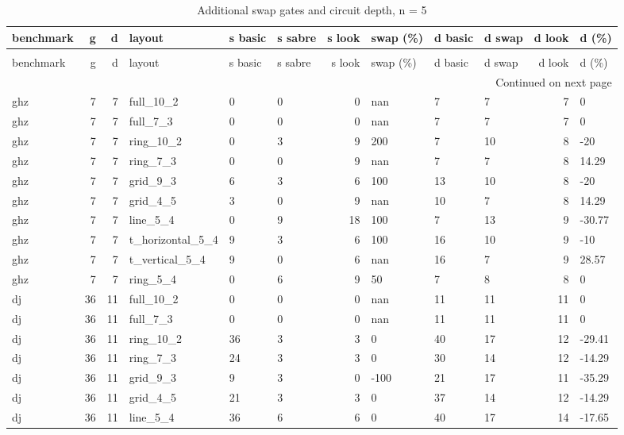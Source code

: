 \begin{longtable}{lrrlllrlllrl}
\caption{Additional swap gates and circuit depth, n = 5} \label{benchmark-table-5} \\
\toprule
benchmark & g & d & layout & s basic & s sabre & s look & swap (\%) & d basic & d swap & d look & d (\%) \\
\midrule
\endfirsthead
\caption[]{Additional swap gates and circuit depth, n = 5} \\
\toprule
benchmark & g & d & layout & s basic & s sabre & s look & swap (\%) & d basic & d swap & d look & d (\%) \\
\midrule
\endhead
\midrule
\multicolumn{12}{r}{Continued on next page} \\
\midrule
\endfoot
\bottomrule
\endlastfoot
ghz & 7 & 7 & full\_10\_2 & 0 & 0 & 0 & nan & 7 & 7 & 7 & 0 \\
ghz & 7 & 7 & full\_7\_3 & 0 & 0 & 0 & nan & 7 & 7 & 7 & 0 \\
ghz & 7 & 7 & ring\_10\_2 & 0 & 3 & 9 & 200 & 7 & 10 & 8 & -20 \\
ghz & 7 & 7 & ring\_7\_3 & 0 & 0 & 9 & nan & 7 & 7 & 8 & 14.29 \\
ghz & 7 & 7 & grid\_9\_3 & 6 & 3 & 6 & 100 & 13 & 10 & 8 & -20 \\
ghz & 7 & 7 & grid\_4\_5 & 3 & 0 & 9 & nan & 10 & 7 & 8 & 14.29 \\
ghz & 7 & 7 & line\_5\_4 & 0 & 9 & 18 & 100 & 7 & 13 & 9 & -30.77 \\
ghz & 7 & 7 & t\_horizontal\_5\_4 & 9 & 3 & 6 & 100 & 16 & 10 & 9 & -10 \\
ghz & 7 & 7 & t\_vertical\_5\_4 & 9 & 0 & 6 & nan & 16 & 7 & 9 & 28.57 \\
ghz & 7 & 7 & ring\_5\_4 & 0 & 6 & 9 & 50 & 7 & 8 & 8 & 0 \\
dj & 36 & 11 & full\_10\_2 & 0 & 0 & 0 & nan & 11 & 11 & 11 & 0 \\
dj & 36 & 11 & full\_7\_3 & 0 & 0 & 0 & nan & 11 & 11 & 11 & 0 \\
dj & 36 & 11 & ring\_10\_2 & 36 & 3 & 3 & 0 & 40 & 17 & 12 & -29.41 \\
dj & 36 & 11 & ring\_7\_3 & 24 & 3 & 3 & 0 & 30 & 14 & 12 & -14.29 \\
dj & 36 & 11 & grid\_9\_3 & 9 & 3 & 0 & -100 & 21 & 17 & 11 & -35.29 \\
dj & 36 & 11 & grid\_4\_5 & 21 & 3 & 3 & 0 & 37 & 14 & 12 & -14.29 \\
dj & 36 & 11 & line\_5\_4 & 36 & 6 & 6 & 0 & 40 & 17 & 14 & -17.65 \\

\end{longtable}
